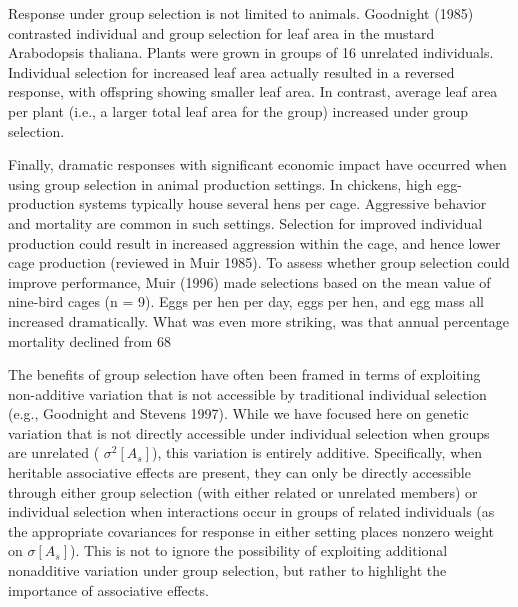 \documentclass{article}
\begin{document}
Response under group selection is not limited to animals. Goodnight (1985) contrasted individual and group selection for leaf area in the mustard Arabodopsis thaliana. Plants were grown in groups of 16 unrelated individuals. Individual selection for increased leaf area actually resulted in a reversed response, with offspring showing smaller leaf area. In contrast, average leaf area per plant (i.e., a larger total leaf area for the group) increased under group selection.

Finally, dramatic responses with significant economic impact have occurred when using group selection in animal production settings. In chickens, high egg-production systems typically house several hens per cage. Aggressive behavior and mortality are common in such settings. Selection for improved individual production could result in increased aggression within the cage, and hence lower cage production (reviewed in Muir 1985). To assess whether group selection could improve performance, Muir (1996) made selections based on the mean value of nine-bird cages (n = 9). Eggs per hen per day, eggs per hen, and egg mass all increased dramatically. What was even more striking, was that annual percentage mortality declined from 68%

The benefits of group selection have often been framed in terms of exploiting non-additive variation that is not accessible by traditional individual selection (e.g., Goodnight and Stevens 1997). While we have focused here on genetic variation that is not directly accessible under individual selection when groups are unrelated ( $ \sigma^2[A_s] $), this variation is entirely additive. Specifically, when heritable associative effects are present, they can only be directly accessible through either group selection (with either related or unrelated members) or individual selection when interactions occur in groups of related individuals (as the appropriate covariances for response in either setting places nonzero weight on  $ \sigma[A_s] $). This is not to ignore the possibility of exploiting additional nonadditive variation under group selection, but rather to highlight the importance of associative effects.
\end{document}
